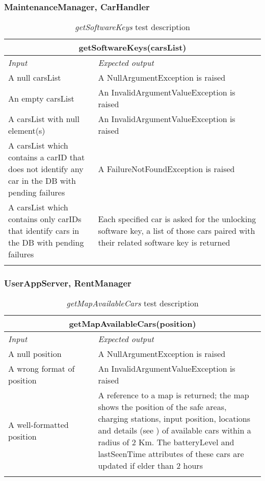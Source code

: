 \clearpage

\subsubsection{MaintenanceManager, CarHandler}
\begin{longtable}{p{0.35\linewidth}p{0.65\linewidth}}
\multicolumn{2}{c}{\textbf{getSoftwareKeys(carsList)}} \\
\toprule
\emph{Input} & \emph{Expected output} \\
\midrule
A null carsList & A NullArgumentException is raised\\
\midrule
An empty carsList & An InvalidArgumentValueException is raised \\
\midrule
A carsList with null element(s) & An InvalidArgumentValueException is raised\\
\midrule
A carsList which contains a carID that does not identify any car in the DB with pending failures & A FailureNotFoundException is raised \\
\midrule
A carsList which contains only carIDs that identify cars in the DB with pending failures & Each specified car is asked for the unlocking software key, a list of those cars paired with their related software key is returned\\
\bottomrule
\caption{\emph{getSoftwareKeys} test description}
\end{longtable}

\subsubsection{UserAppServer, RentManager}

\begin{longtable}{p{0.35\linewidth}p{0.65\linewidth}}
\multicolumn{2}{c}{\textbf{getMapAvailableCars(position)}} \\
\toprule
\emph{Input} & \emph{Expected output} \\
\midrule
A null position & A NullArgumentException is raised\\
\midrule
A wrong format of position & An InvalidArgumentValueException is raised \\
\midrule
A well-formatted position & A reference to a map is returned; the map shows the position of the safe areas, charging stations, input position, locations and details (see \cite{DD}) of available cars within a radius of 2 Km. The batteryLevel and lastSeenTime attributes of these cars are updated if elder than 2 hours\\
\bottomrule
\caption{\emph{getMapAvailableCars} test description}
\end{longtable}

